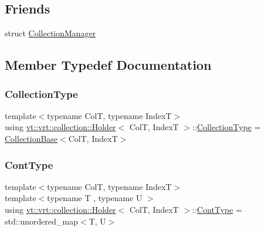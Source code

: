 \subsection*{Friends}
\begin{DoxyCompactItemize}
\item 
struct \hyperlink{structvt_1_1vrt_1_1collection_1_1_holder_af9288b1963f434a90b307b5305a49510}{Collection\+Manager}
\end{DoxyCompactItemize}


\subsection{Member Typedef Documentation}
\mbox{\label{structvt_1_1vrt_1_1collection_1_1_holder_a38b4a4bfc4408cf28918c32433c80aac}} 
\subsubsection{\texorpdfstring{Collection\+Type}{CollectionType}}
{\footnotesize\ttfamily template$<$typename ColT, typename IndexT$>$ \\
using \hyperlink{structvt_1_1vrt_1_1collection_1_1_holder}{vt\+::vrt\+::collection\+::\+Holder}$<$ ColT, IndexT $>$\+::\hyperlink{structvt_1_1vrt_1_1collection_1_1_holder_a38b4a4bfc4408cf28918c32433c80aac}{Collection\+Type} =  \hyperlink{structvt_1_1vrt_1_1collection_1_1_collection_base}{Collection\+Base}$<$ColT, IndexT$>$}

\mbox{\label{structvt_1_1vrt_1_1collection_1_1_holder_ae3bb115b69cf47e14a4e8441cebe9142}} 
\subsubsection{\texorpdfstring{Cont\+Type}{ContType}}
{\footnotesize\ttfamily template$<$typename ColT, typename IndexT$>$ \\
template$<$typename T , typename U $>$ \\
using \hyperlink{structvt_1_1vrt_1_1collection_1_1_holder}{vt\+::vrt\+::collection\+::\+Holder}$<$ ColT, IndexT $>$\+::\hyperlink{structvt_1_1vrt_1_1collection_1_1_holder_ae3bb115b69cf47e14a4e8441cebe9142}{Cont\+Type} =  std\+::unordered\+\_\+map$<$T, U$>$}

